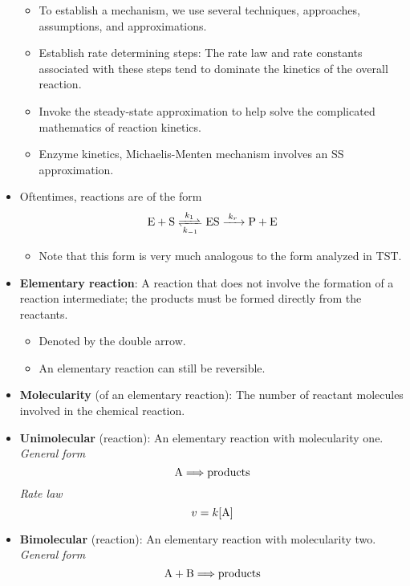 \documentclass[../notes.tex]{subfiles}
\begin{document}
\begin{itemize}
\begin{itemize}
        \item To establish a mechanism, we use several techniques, approaches, assumptions, and approximations.
        \item Establish rate determining steps: The rate law and rate constants associated with these steps tend to dominate the kinetics of the overall reaction.
        \item Invoke the steady-state approximation to help solve the complicated mathematics of reaction kinetics.
        \item Enzyme kinetics, Michaelis-Menten mechanism involves an SS approximation.
    \end{itemize}
    \item Oftentimes, reactions are of the form
    \begin{align*}
        \ce{E + S <=>[$k_1$][$k_{-1}$] ES ->[$k_r$] P + E}
    \end{align*}
    \begin{itemize}
        \item Note that this form is very much analogous to the form analyzed in TST.
    \end{itemize}
    \item \textbf{Elementary reaction}: A reaction that does not involve the formation of a reaction intermediate; the products must be formed directly from the reactants.
    \begin{itemize}
        \item Denoted by the double arrow.
        \item An elementary reaction can still be reversible.
    \end{itemize}
    \item \textbf{Molecularity} (of an elementary reaction): The number of reactant molecules involved in the chemical reaction.
    \item \textbf{Unimolecular} (reaction): An elementary reaction with molecularity one. \emph{General form}
    \begin{equation*}
        \ce{A} \Longrightarrow \text{products}
    \end{equation*}
    \emph{Rate law}
    \begin{equation*}
        v = k[\ce{A}]
    \end{equation*}
    \item \textbf{Bimolecular} (reaction): An elementary reaction with molecularity two. \emph{General form}
    \begin{equation*}
        \ce{A}+\ce{B} \Longrightarrow \text{products}

\end{equation*}
\end{itemize}
\end{document}
